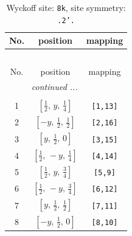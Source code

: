 \documentclass[fleqn,8pt]{jsarticle}
\begin{document}
\begin{longtable}{ccc}
\caption{Wyckoff site: {\tt 8k}, site symmetry: {\tt .2'.}}
 \\
 \hline \hline
No. & position & mapping \\ \hline \endfirsthead

\multicolumn{2}{l}{\tablename\ \thetable{}} \\
 \hline \hline
No. & position & mapping \\ \hline \endhead

 \hline \hline
\multicolumn{2}{r}{\footnotesize\it continued ...} \\ \endfoot

 \hline \hline
\multicolumn{2}{r}{} \\ \endlastfoot

1 & $\left[ \frac{1}{2},\, y,\, \frac{1}{4} \right]$ & {\tt [1,13]} \\ \hline
2 & $\left[ - y,\, \frac{1}{2},\, \frac{1}{2} \right]$ & {\tt [2,16]} \\ \hline
3 & $\left[ y,\, \frac{1}{2},\, 0 \right]$ & {\tt [3,15]} \\ \hline
4 & $\left[ \frac{1}{2},\, - y,\, \frac{1}{4} \right]$ & {\tt [4,14]} \\ \hline
5 & $\left[ \frac{1}{2},\, y,\, \frac{3}{4} \right]$ & {\tt [5,9]} \\ \hline
6 & $\left[ \frac{1}{2},\, - y,\, \frac{3}{4} \right]$ & {\tt [6,12]} \\ \hline
7 & $\left[ y,\, \frac{1}{2},\, \frac{1}{2} \right]$ & {\tt [7,11]} \\ \hline
8 & $\left[ - y,\, \frac{1}{2},\, 0 \right]$ & {\tt [8,10]} \\
\end{longtable}
\renewcommand{\arraystretch}{1.2}
\end{document}
